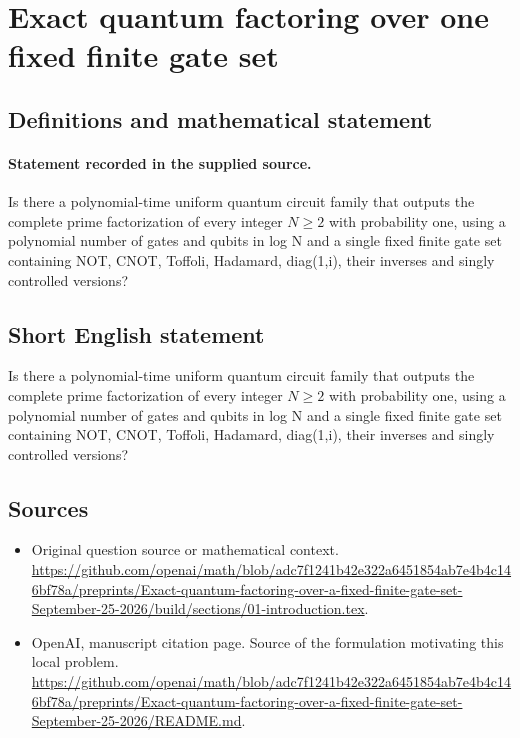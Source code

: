 \documentclass[11pt]{article}
\begin{document}
\section*{Exact quantum factoring over one fixed finite gate set}\label{30007221}
\subsection{Definitions and mathematical statement}
\paragraph{Statement recorded in the supplied source.}
Is there a polynomial-time uniform quantum circuit family that outputs the complete prime factorization of every integer $N\geq 2$ with probability one, using a polynomial number of gates and qubits in log N and a single fixed finite gate set containing NOT, CNOT, Toffoli, Hadamard, diag(1,i), their inverses and singly controlled versions?
\subsection{Short English statement}
Is there a polynomial-time uniform quantum circuit family that outputs the complete prime factorization of every integer $N\geq 2$ with probability one, using a polynomial number of gates and qubits in log N and a single fixed finite gate set containing NOT, CNOT, Toffoli, Hadamard, diag(1,i), their inverses and singly controlled versions?
\subsection{Sources}
\begin{itemize}
\item[S1] Original question source or mathematical context.
\url{https://github.com/openai/math/blob/adc7f1241b42e322a6451854ab7e4b4c146bf78a/preprints/Exact-quantum-factoring-over-a-fixed-finite-gate-set-September-25-2026/build/sections/01-introduction.tex}.
\item[S2] OpenAI, manuscript citation page. Source of the formulation motivating this local problem.
\url{https://github.com/openai/math/blob/adc7f1241b42e322a6451854ab7e4b4c146bf78a/preprints/Exact-quantum-factoring-over-a-fixed-finite-gate-set-September-25-2026/README.md}.
\end{itemize}
\end{document}
